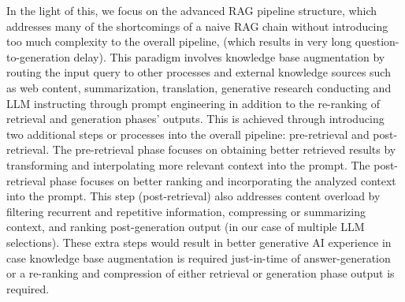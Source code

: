 In the light of this, we focus on the advanced RAG pipeline structure, which addresses many of the shortcomings of a naive RAG chain without introducing too much complexity to the overall pipeline, (which results in very long question-to-generation delay).
This paradigm involves knowledge base augmentation by routing the input query to other processes and external knowledge sources such as web content, summarization, translation, generative research conducting and LLM instructing through prompt engineering in addition to the re-ranking of retrieval and generation phases' outputs. This is achieved through introducing two additional steps or processes into the overall pipeline: pre-retrieval and post-retrieval. The pre-retrieval phase focuses on obtaining better retrieved results by transforming and interpolating more relevant context into the prompt. The post-retrieval phase focuses on better ranking and incorporating the analyzed context into the prompt. This step (post-retrieval) also addresses content overload by filtering recurrent and repetitive information, compressing or summarizing context, and ranking post-generation output (in our case of multiple LLM selections).\newline
These extra steps would result in better generative AI experience in case knowledge base augmentation is required just-in-time of answer-generation or a re-ranking and compression of either retrieval or generation phase output is required.
\newpage

